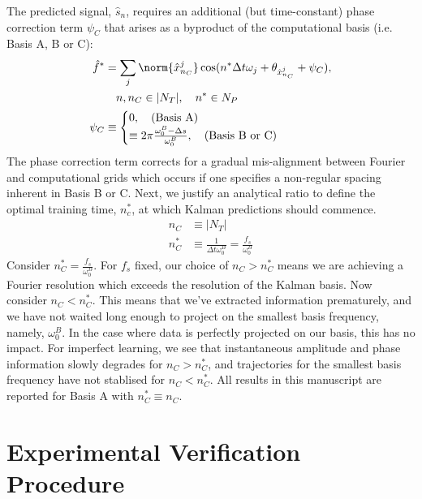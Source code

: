 The predicted signal, $\hat{s}_n$, requires an additional (but time-constant) phase correction term $\psi_C$ that arises as a byproduct of the computational basis (i.e. Basis A, B or C):
\begin{align}
\hat{f}^* &= \sum_j\norm{\hat{x}^j_{n_C}} \cos(n^*\Delta t \omega_j + \theta_{\hat{x}^j_{n_C}} + \psi_C), \\
& \quad  n, n_C \in |N_T|, \quad n^* \in N_P \nonumber \\
\psi_C & \equiv \begin{cases}
0,  \quad \text{(Basis A)} \\
\equiv 2\pi \frac{\omega_0^B - \Delta s}{\omega_0^B }, \quad \text{(Basis B or C)} \\
\end{cases}
\end{align}
The phase correction term corrects for a gradual mis-alignment between Fourier and computational grids which occurs if one specifies a non-regular spacing inherent in Basis B or C. Next, we justify an analytical ratio to define the optimal training time, $n_c^*$, at which Kalman predictions should commence. 
\begin{align}
n_C  &\equiv |N_T| \\
n_C^* &\equiv \frac{1}{\Delta t \omega_0^B} = \frac{f_s}{\omega_0^B} \label{eqn:sec:ap_liska_fixedbasis_nC}
\end{align}
Consider $n_C^* = \frac{f_s}{\omega_0^B}$.  For $f_s$ fixed, our choice of $n_C > n_C^* $ means we are achieving a Fourier resolution which exceeds the resolution of the Kalman basis. Now consider $n_C < n_C^*$. This means that we've extracted information prematurely, and we have not waited long enough to project on the smallest basis frequency, namely, $\omega_0^B$.  In the case where data is perfectly projected on our basis, this has no impact. For imperfect learning, we see that instantaneous amplitude and phase information slowly degrades for $n_C > n_C^*$, and trajectories for the smallest basis frequency have not stablised for $n_C < n_C^*$. 
All results in this manuscript are reported for Basis A with $n_C^* \equiv n_C$.

\section{Experimental Verification Procedure \label{sec:app:exptverfication}}

